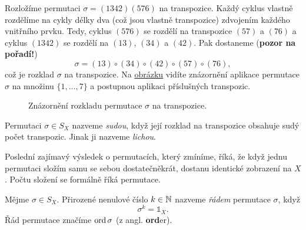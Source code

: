 \begin{example}
 Rozložíme permutaci $\sigma = (1342)(576)$ na transpozice. Každý cyklus vlastně
 rozdělíme na cykly délky dva (což jsou vlastně transpozice) zdvojením každého
 vnitřního prvku. Tedy, cyklus $(576)$ se rozdělí na transpozice $(57)$ a $(76)$
 a cyklus  $(1342)$ se rozdělí na $(13)$, $(34)$ a $(42)$. Pak dostaneme
 (\textbf{pozor na pořadí!})
 \[
  \sigma = (13) \circ (34) \circ (42) \circ (57) \circ (76),
 \]
 což je rozklad $\sigma$ na transpozice. Na
 \hyperref[fig:rozklad-na-transpozice]{obrázku} vidíte znázornění aplikace
 permutace $\sigma$ na množinu $\{1,\ldots,7\}$ a postupnou aplikaci příslušných
 transpozic.
 \begin{figure}[H]
  \centering
  \label{fig:rozklad-na-transpozice}
  \caption{Znázornění rozkladu permutace $\sigma$ na transpozice.}
 \end{figure}
\end{example}

\begin{definition}
\label{def:suda/licha-permutace}
 Permutaci $\sigma \in S_X$ nazveme \emph{sudou}, když její rozklad na
 transpozice obsahuje sudý počet transpozic. Jinak ji nazveme \emph{lichou}.
\end{definition}

Poslední zajímavý výsledek o permutacích, který zmíníme, říká, že když jednu
permutaci složím samu se sebou dostatečněkrát, dostanu identické zobrazení na
$X$. Počtu složení se formálně říká  permutace.

\begin{definition}
\label{def:rad-permutace}
 Mějme $\sigma \in S_X$. Přirozené nenulové číslo ${k \in \mathbb{N}}$ nazveme
 \emph{řádem} permutace $\sigma$, když
 \[
  \sigma^{k} = \mathds{1}_X.
 \]
 Řád permutace značíme $\operatorname{ord} \sigma$ (z angl. \textbf{ord}er).
\end{definition}

